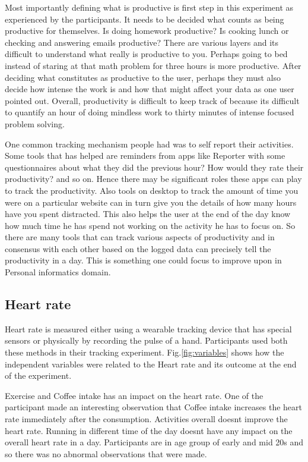 Most importantly defining what is productive is first step in this experiment as experienced by the participants. It needs to be decided what counts as being productive for themselves. Is doing homework productive? Is cooking lunch or checking and answering emails productive? There are various layers and it\textquotesingle s difficult to understand what really is productive to you. Perhaps going to bed instead of staring at that math problem for three hours is more productive. After deciding what constitutes as productive to the user, perhaps they must also decide how intense the work is and how that might affect your data as one user pointed out. Overall, productivity is difficult to keep track of because it\textquotesingle s difficult to quantify an hour of doing mindless work to thirty minutes of intense focused problem solving. 

One common tracking mechanism people had was to self report their activities. Some tools that has helped are reminders from apps like Reporter with some questionnaires about what they did the previous hour? How would they rate their productivity? and so on. Hence there may be significant roles these apps can play to track the productivity. Also tools on desktop to track the amount of time you were on a particular website can in turn give you the details of how many hours have you spent distracted. This also helps the user at the end of the day know how much time he has spend not working on the activity he has to focus on. So there are many tools that can track various aspects of productivity and in consensus with each other based on the logged data can precisely tell the productivity in a day. This is something one could focus to improve upon in Personal informatics domain.

\subsection{Heart rate}
Heart rate is measured either using a wearable tracking device that has special sensors or physically by recording the pulse of a hand. Participants used both these methods in their tracking experiment. 
Fig.\ref{fig:variables} shows how the independent variables were related to the Heart rate and its outcome at the end of the experiment.

Exercise and Coffee intake has an impact on the heart rate. One of the participant made an interesting observation that Coffee intake increases the heart rate immediately after the consumption. Activities overall doesn\textquotesingle t improve the heart rate. Running in different time of the day doesn\textquotesingle t have any impact on the overall heart rate in a day. Participants are in age group of early and mid 20s and so there was no abnormal observations that were made. 

